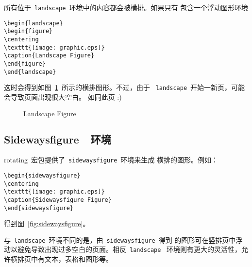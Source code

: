 所有位于~\texttt{landscape}~环境中的内容都会被横排。如果只有
包含一个浮动图形环境
\begin{Verbatim}[xleftmargin=1cm]
\begin{landscape} 
\begin{figure} 
\centering 
\texttt{[image: graphic.eps]} 
\caption{Landscape Figure} 
\end{figure} 
\end{landscape}
\end{Verbatim}
这时会得到如图~\ref{fig:landscape}~所示的横排图形。不过，由于
~\texttt{landscape}~开始一新页，可能会导致页面出现很大空白。
如同此页 :)

\begin{landscape} 
	\begin{figure} 
		\centering
		\resizebox{4in}{!}{\usebox{\graphic}}
		\caption{Landscape Figure}\label{fig:landscape}
	\end{figure} 
\end{landscape}

\subsection{Sidewaysfigure~~环境}\label{ssec:sidewaysfigure}

\textsf{rotating}~宏包提供了~\texttt{sidewaysfigure}~环境来生成
横排的图形。例如：
\begin{Verbatim}[xleftmargin=1cm]
\begin{sidewaysfigure} 
\centering 
\texttt{[image: graphic.eps]} 
\caption{Sidewaysfigure Figure} 
\end{sidewaysfigure}
\end{Verbatim}
得到图~\ref{fig:sidewaysfigure}。

\begin{sidewaysfigure}
	\centering
	\resizebox{4in}{!}{\usebox{\graphic}}
	\caption{Sidewaysfigure Figure}\label{fig:sidewaysfigure}
\end{sidewaysfigure}

与~\texttt{landscape}~环境不同的是，由~\texttt{sidewaysfigure}~得到
的图形可在竖排页中浮动以避免导致出现过多空白的页面。相反~\texttt{landscape}~
环境则有更大的灵活性，允许横排页中有文本，表格和图形等。

